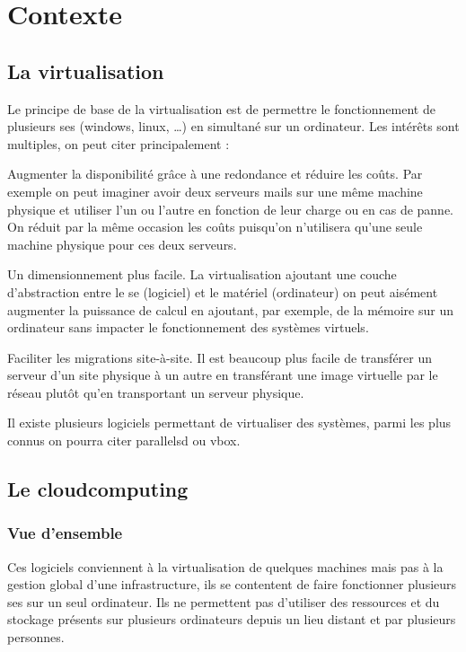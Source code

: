 \documentclass[a4paper,oneside]{report}
\begin{document}
\section{Contexte}
\subsection{La \gls{virtualisation}}
Le principe de base de la \gls{virtualisation} est de permettre le fonctionnement de plusieurs \glspl{se} (\gls{windows}, \gls{linux}, …) en simultané sur un ordinateur.
Les intérêts sont multiples, on peut citer principalement :\newline

Augmenter la disponibilité grâce à une redondance et réduire les coûts.
Par exemple on peut imaginer avoir deux serveurs mails sur une même machine physique et utiliser l’un ou l’autre en fonction de leur charge ou en cas de panne.
On réduit par la même occasion les coûts puisqu’on n’utilisera qu’une seule machine physique pour ces deux serveurs.

Un dimensionnement plus facile. La \gls{virtualisation} ajoutant une couche d’abstraction entre le \gls{se} (logiciel) et le matériel (ordinateur) on peut aisément augmenter la puissance de calcul en ajoutant, par exemple, de la mémoire sur un ordinateur sans impacter le fonctionnement des systèmes virtuels.

Faciliter les migrations site-à-site.
Il est beaucoup plus facile de transférer un serveur d’un site physique à un autre en transférant une image virtuelle par le réseau plutôt qu’en transportant un serveur physique.\newline

Il existe plusieurs logiciels permettant de virtualiser des systèmes, parmi les plus connus on pourra citer \gls{parallelsd} ou \gls{vbox}.

\subsection{Le \gls{cloudcomputing}}
\subsubsection{Vue d'ensemble}
Ces logiciels conviennent à la \gls{virtualisation} de quelques machines mais pas à la gestion global d'une infrastructure, ils se contentent de faire fonctionner plusieurs \glspl{se} sur un seul ordinateur.
Ils ne permettent pas d'utiliser des ressources et du stockage présents sur plusieurs ordinateurs depuis un lieu distant et par plusieurs personnes.
\end{document}
